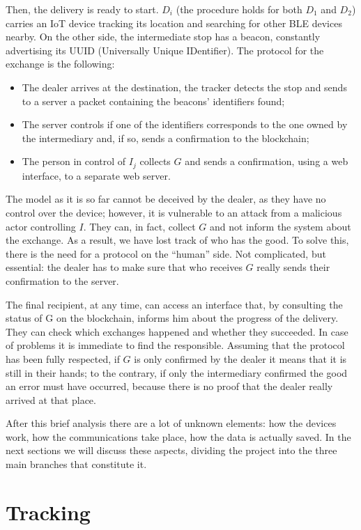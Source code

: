 Then, the delivery is ready to start. $D_i$ (the procedure holds for both $D_1$ and $D_2$) carries an IoT device tracking its location and searching for other BLE devices nearby. On the other side, the intermediate stop has a beacon, constantly advertising its UUID (Universally Unique IDentifier). The protocol for the exchange is the following: 
\begin{itemize}
    \item The dealer arrives at the destination, the tracker detects the stop and sends to a server a packet containing the beacons' identifiers found;
    \item The server controls if one of the identifiers corresponds to the one owned by the intermediary and, if so, sends a confirmation to the blockchain;
    \item The person in control of $I_j$ collects $G$ and sends a confirmation, using a web interface, to a separate web server.
\end{itemize}

The model as it is so far cannot be deceived by the dealer, as they have no control over the device; however, it is vulnerable to an attack from a malicious actor controlling $I$. They can, in fact, collect $G$ and not inform the system about the exchange. As a result, we have lost track of who has the good. To solve this, there is the need for a protocol on the ``human'' side. Not complicated, but essential: the dealer has to make sure that who receives $G$ really sends their confirmation to the server. 

The final recipient, at any time, can access an interface that, by consulting the status of G on the blockchain, informs him about the progress of the delivery. They can check which exchanges happened and whether they succeeded. In case of problems it is immediate to find the responsible. Assuming that the protocol has been fully respected, if $G$ is only confirmed by the dealer it means that it is still in their hands; to the contrary, if only the intermediary confirmed the good an error must have occurred, because there is no proof that the dealer really arrived at that place.

After this brief analysis there are a lot of unknown elements: how the devices work, how the communications take place, how the data is actually saved. In the next sections we will discuss these aspects, dividing the project into the three main branches that constitute it.


\section{Tracking}
\label{sec:tracking}


